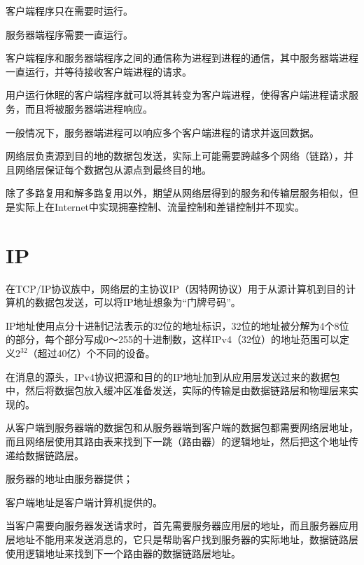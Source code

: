 \begin{compactitem}
\item 客户端程序只在需要时运行。
\item 服务器端程序需要一直运行。
\end{compactitem}

客户端程序和服务器端程序之间的通信称为进程到进程的通信，其中服务器端进程一直运行，并等待接收客户端进程的请求。

用户运行休眠的客户端程序就可以将其转变为客户端进程，使得客户端进程请求服务，而且将被服务器端进程响应。

一般情况下，服务器端进程可以响应多个客户端进程的请求并返回数据。

网络层负责源到目的地的数据包发送，实际上可能需要跨越多个网络（链路），并且网络层保证每个数据包从源点到最终目的地。

除了多路复用和解多路复用以外，期望从网络层得到的服务和传输层服务相似，但是实际上在Internet中实现拥塞控制、流量控制和差错控制并不现实。



\section{IP}

在TCP/IP协议族中，网络层的主协议IP（因特网协议）用于从源计算机到目的计算机的数据包发送，可以将IP地址想象为“门牌号码”。



IP地址使用点分十进制记法表示的32位的地址标识，32位的地址被分解为4个8位的部分，每个部分写成0～255的十进制数，这样IPv4（32位）的地址范围可以定义$2^{32}$（超过40亿）个不同的设备。

在消息的源头，IPv4协议把源和目的的IP地址加到从应用层发送过来的数据包中，然后将数据包放入缓冲区准备发送，实际的传输是由数据链路层和物理层来实现的。

从客户端到服务器端的数据包和从服务器端到客户端的数据包都需要网络层地址，而且网络层使用其路由表来找到下一跳（路由器）的逻辑地址，然后把这个地址传递给数据链路层。

\begin{compactitem}
\item 服务器的地址由服务器提供；
\item 客户端地址是客户端计算机提供的。
\end{compactitem}

当客户需要向服务器发送请求时，首先需要服务器应用层的地址，而且服务器应用层地址不能用来发送消息的，它只是帮助客户找到服务器的实际地址，数据链路层使用逻辑地址来找到下一个路由器的数据链路层地址。


